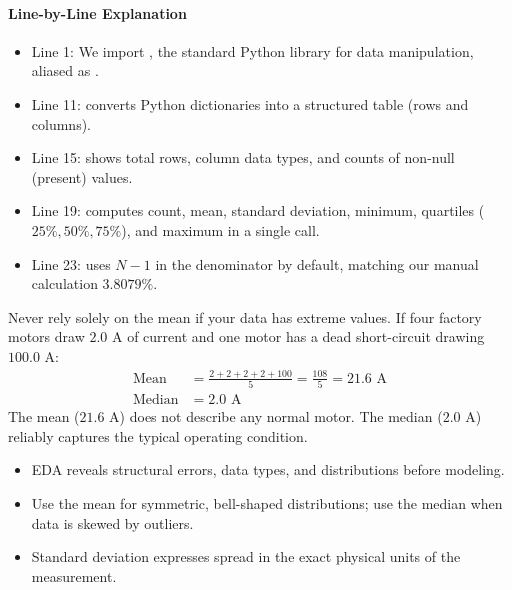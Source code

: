 \paragraph{Line-by-Line Explanation}
\begin{itemize}
    \item Line 1: We import , the standard Python library for data manipulation, aliased as .
    \item Line 11:  converts Python dictionaries into a structured table (rows and columns).
    \item Line 15:  shows total rows, column data types, and counts of non-null (present) values.
    \item Line 19:  computes count, mean, standard deviation, minimum, quartiles ($25\%, 50\%, 75\%$), and maximum in a single call.
    \item Line 23:  uses $N-1$ in the denominator by default, matching our manual calculation $3.8079\%$.
\end{itemize}

\begin{warning}
Never rely solely on the mean if your data has extreme values. If four factory motors draw $2.0\text{ A}$ of current and one motor has a dead short-circuit drawing $100.0\text{ A}$:
\begin{align*}
\text{Mean} &= \frac{2 + 2 + 2 + 2 + 100}{5} = \frac{108}{5} = 21.6\text{ A} \\
\text{Median} &= 2.0\text{ A}
\end{align*}
The mean ($21.6\text{ A}$) does not describe any normal motor. The median ($2.0\text{ A}$) reliably captures the typical operating condition.
\end{warning}

\begin{takeaways}
\begin{itemize}
    \item EDA reveals structural errors, data types, and distributions before modeling.
    \item Use the mean for symmetric, bell-shaped distributions; use the median when data is skewed by outliers.
    \item Standard deviation expresses spread in the exact physical units of the measurement.
\end{itemize}
\end{takeaways}

